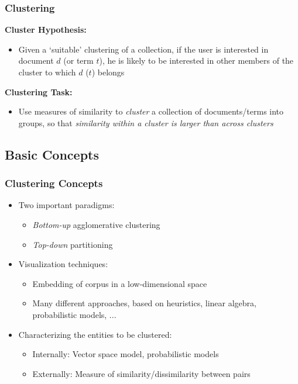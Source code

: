 \documentclass{beamer}
\begin{document}

\begin{frame}
  \frametitle{Clustering}

  \textbf{Cluster Hypothesis:}
  \begin{itemize}
  \item Given a `suitable' clustering of a collection, if the user is
    interested in document $d$ (or term $t$), he is likely to be interested
    in other members of the cluster to which $d$ ($t$) belongs
  \end{itemize}

  \textbf{Clustering Task:}
  \begin{itemize}
  \item Use measures of similarity to \emph{cluster} a collection of
    documents/terms into groups, so that \emph{similarity within a cluster
      is larger than across clusters}
  \end{itemize}

\end{frame}


\subsection{Basic Concepts}

\begin{frame}
  \frametitle{Clustering Concepts}

  \begin{itemize}
  \item Two important paradigms:
    \begin{itemize}
    \item \emph{Bottom-up} agglomerative clustering
    \item \emph{Top-down} partitioning
    \end{itemize}
  \item Visualization techniques:
    \begin{itemize}
    \item Embedding of corpus in a low-dimensional space
    \item Many different approaches, based on heuristics, linear algebra, probabilistic models, ...
    \end{itemize}
  \item Characterizing the entities to be clustered:
    \begin{itemize}
    \item Internally: Vector space model, probabilistic models
    \item Externally: Measure of similarity/dissimilarity between pairs
    \end{itemize}
  \end{itemize}

\end{frame}
\end{document}

